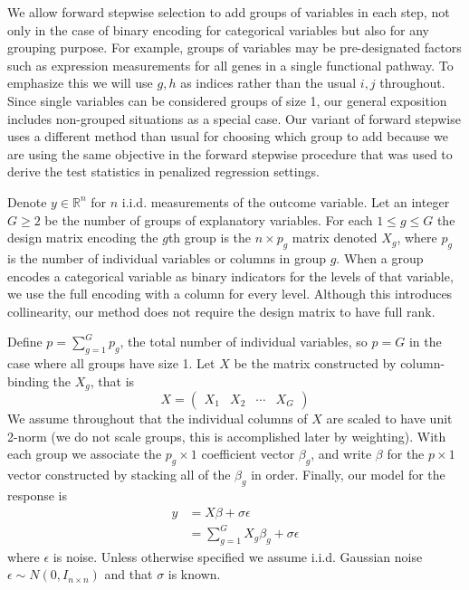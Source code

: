 \documentclass{imsart}
\newcommand{\real}{\mathbb{R}}
\begin{document}
We allow forward stepwise selection to add groups of variables in each
step, not only in the case of binary encoding for categorical
variables but also for any grouping purpose. For example, groups of
variables may be pre-designated factors such as expression
measurements for all genes in a single functional pathway.
To emphasize this we will use $g, h$ as indices rather than the usual
$i, j$ throughout. Since single variables can be considered groups of
size 1, our general exposition includes non-grouped situations as a special
case. Our variant of forward stepwise uses a different method than
usual for choosing which group to add because we are using the
same objective in the forward stepwise procedure that was used to
derive the test statistics in penalized regression settings.

Denote $y \in \real^n$ for $n$ i.i.d. measurements of the outcome variable.
Let an integer $G \geq 2$ be the number of groups of explanatory variables.
For each $1 \leq g \leq G$ the design matrix encoding the
$g$th group is the $n \times p_g$ matrix denoted $X_g$, where $p_g$ is
the number of individual variables or columns in group $g$.
When a group encodes a categorical variable as binary indicators for the
levels of that variable, we use the full encoding with a column for every
level. Although this introduces collinearity, our method does not require
the design matrix to have full rank.


Define $p = \sum_{g=1}^Gp_g$,
the total number of individual variables, so $p = G$ in the
case where all groups have size 1. Let $X$ be the matrix constructed
by column-binding the $X_g$, that is  
\begin{equation*}
X = \begin{pmatrix} X_1 & X_2 & \cdots & X_G  \end{pmatrix}
\end{equation*}
We assume throughout that the individual columns of $X$ are scaled to
have unit 2-norm (we do not scale groups, this is accomplished later
by weighting).
With each group we associate the $p_g \times 1$ coefficient vector
$\beta_g$, and write $\beta$ for the $p \times 1$ vector constructed
by stacking all of the $\beta_g$ in order.  Finally, our model for the
response is
\begin{equation}
\begin{aligned}
\label{eq:gmodel}
y & = X \beta + \sigma \epsilon \\
   & = \sum_{g=1}^G X_g \beta_g + \sigma \epsilon
\end{aligned}
\end{equation}
where $\epsilon$ is noise. Unless otherwise specified we assume
i.i.d. Gaussian noise $\epsilon \sim N(0, I_{n \times n})$ and that
$\sigma$ is known.
\end{document}

